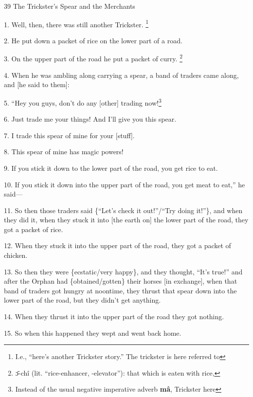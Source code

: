
39 The Trickster's Spear and the Merchants

1. Well, then, there was still another Trickster. \footnote{I.e., ``here's another Trickster story.'' The trickster is here referred to}

2. He put down a packet of rice on the lower part of a road.

3. On the upper part of the road he put a packet of curry. \footnote{ɔ̄-chî (lit. ``rice-enhancer, -elevator''): that which is eaten with rice,}

4. When he was ambling along carrying a spear, a band of traders came along, and
[he said to them]:

5. ``Hey you guys, don't do any [other] trading now!\footnote{Instead of the usual negative imperative adverb \textbf{mâ}, Trickster here}

6. Just trade me your things! And I'll give you this spear.

7. I trade this spear of mine for your [stuff].

8. This spear of mine has magic powers!

9. If you stick it down to the lower part of the road, you get rice to eat.

10. If you stick it down into the upper part of the road, you get meat to eat,''
he said---

11. So then those traders said \{``Let's check it out!''/``Try doing it!''\}, and
when they did it, when they stuck it into [the earth on] the lower part of the
road, they got a packet of rice.

12. When they stuck it into the upper part of the road, they got a packet of chicken.

13. So then they were \{ecstatic/very happy\}, and they thought, ``It's true!''
and after the Orphan had \{obtained/gotten\} their horses [in exchange], when that
band of traders got hungry at noontime, they thrust that spear down into the lower
part of the road, but they didn't get anything.

14. When they thrust it into the upper part of the road they got nothing.

15. So when this happened they wept and went back home.

